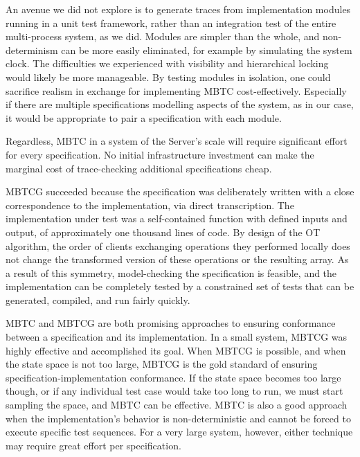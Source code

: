\documentclass{vldb}
\begin{document}
An avenue we did not explore is to generate traces from implementation modules running in a unit test framework, rather than an integration test of the entire multi-process system, as we did.
Modules are simpler than the whole, and non-determinism can be more easily eliminated, for example by simulating the system clock. 
The difficulties we experienced with visibility and hierarchical locking would likely be more manageable.
By testing modules in isolation, one could sacrifice realism in exchange for implementing MBTC cost-effectively.
Especially if there are multiple specifications modelling aspects of the system, as in our case, it would be appropriate to pair a specification with each module.

Regardless, MBTC in a system of the Server's scale will require significant effort for every specification.
No initial infrastructure investment can make the marginal cost of trace-checking additional specifications cheap.

\balance

MBTCG succeeded because the specification was deliberately written with a close correspondence to the implementation, via direct transcription.
The implementation under test was a self-contained function with defined inputs and output, of approximately one thousand lines of code. 
By design of the OT algorithm, the order of clients exchanging operations they performed locally does not change the transformed version of these operations or the resulting array.
As a result of this symmetry, model-checking the specification is feasible, and the implementation can be completely tested by a constrained set of tests that can be generated, compiled, and run fairly quickly.

MBTC and MBTCG are both promising approaches to ensuring conformance between a specification and its implementation.
In a small system, MBTCG was highly effective and accomplished its goal.
When MBTCG is possible, and when the state space is not too large, MBTCG is the gold standard of ensuring specification-implementation conformance.
If the state space becomes too large though, or if any individual test case would take too long to run, we must start sampling the space, and MBTC can be effective.
MBTC is also a good approach when the implementation's behavior is non-deterministic and cannot be forced to execute specific test sequences.
For a very large system, however, either technique may require great effort per specification.
\end{document}
